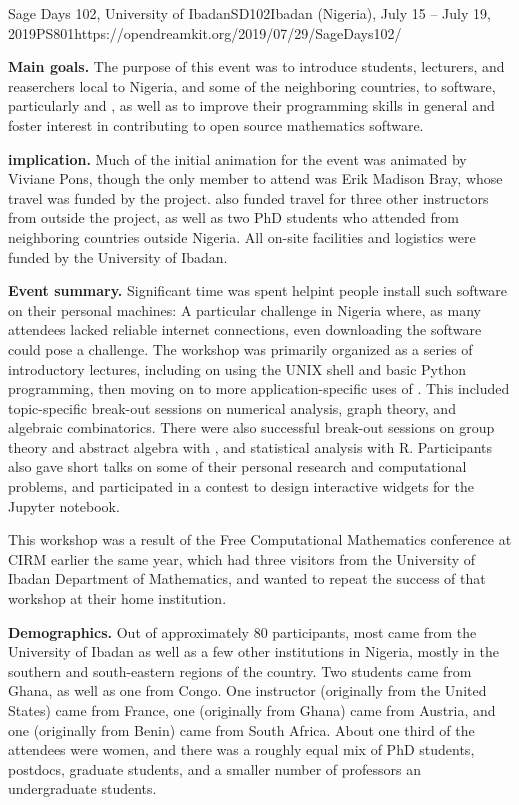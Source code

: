 \begin{event}{Sage Days 102, University of Ibadan}{SD102}{Ibadan (Nigeria), July 15 -- July 19, 2019}{PS}{80}{1}{https://opendreamkit.org/2019/07/29/SageDays102/}

\textbf{Main goals.} The purpose of this event was to introduce students,
lecturers, and reaserchers local to Nigeria, and some of the
neighboring countries, to \ODK software, particularly \Sage and \GAP,
as well as to improve their programming skills in general and foster
interest in contributing to open source mathematics software.

\textbf{\ODK implication.} Much of the initial animation for the event was
animated by Viviane Pons, though the only \ODK member to attend was
Erik Madison Bray, whose travel was funded by the project.  \ODK also
funded travel for three other instructors from outside the project, as
well as two PhD students who attended from neighboring countries
outside Nigeria.  All on-site facilities and logistics were funded by the
University of Ibadan.

\textbf{Event summary.} Significant time was spent helpint people install such
software on their personal machines: A particular challenge in Nigeria
where, as many attendees lacked reliable internet connections, even
downloading the software could pose a challenge.  The workshop was
primarily organized as a series of introductory lectures, including on
using the UNIX shell and basic Python programming, then moving on to
more application-specific uses of \Sage.  This included
topic-specific break-out sessions on numerical analysis, graph
theory, and algebraic combinatorics.  There were also successful
break-out sessions on group theory and abstract algebra with \GAP, and
statistical analysis with R. Participants also gave short talks on some
of their personal research and computational problems, and
participated in a contest to design interactive widgets for the Jupyter
notebook.

This workshop was a result of the Free Computational Mathematics conference at
CIRM earlier the same year, which had three visitors from the University
of Ibadan Department of Mathematics, and wanted to repeat the success of
that workshop at their home institution.


\textbf{Demographics.} Out of approximately 80 participants, most came from the
University of Ibadan as well as a few other institutions in Nigeria,
mostly in the southern and south-eastern regions of the country.  Two
students came from Ghana, as well as one from Congo.  One instructor
(originally from the United States) came from France, one (originally
from Ghana) came from Austria, and one (originally from Benin) came
from South Africa.  About one third of the attendees were women, and
there was a roughly equal mix of PhD students, postdocs, graduate
students, and a smaller number of professors an undergraduate students.


\end{event}
